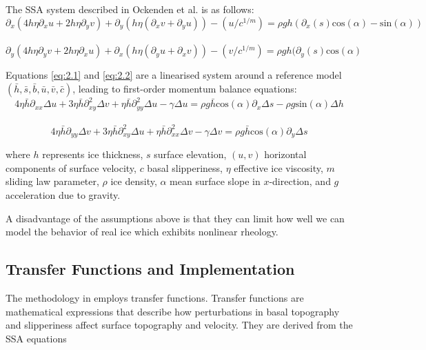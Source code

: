 The SSA system described in Ockenden et al.\cite{Ockenden_2022} is as follows:
\begin{equation}\partial_{x} (4 h \eta \partial_{x} u + 2 h \eta \partial_y v) + \partial_{y}(h \eta( \partial_{x} v + \partial_{y} u)) - (u/c^{1/m}) = \rho g h ( \partial_{x} (s) \mathrm{cos}(\alpha) - \mathrm{sin}(\alpha))
\end{equation}\label{eq:2.1}\\
\begin{equation}\partial_{y} (4 h \eta \partial_{y} v + 2 h \eta \partial_x u) + \partial_{x}(h \eta( \partial_{y} u + \partial_{x} v)) - (v/c^{1/m}) = \rho g h ( \partial_{y} (s) \mathrm{cos}(\alpha)
\end{equation}\label{eq:2.2}

Equations \ref{eq:2.1} and \ref{eq:2.2} are a linearised system around a reference model $(\bar{h}, \bar{s}, \bar{b}, \bar{u}, \bar{v}, \bar{c})$, leading to first-order momentum balance equations:
\begin{equation}
4 \eta \bar{h} \partial_{xx} \Delta u + 3 \eta \bar{h} \partial_{xy}^{2} \Delta v + \eta \bar{h} \partial_{yy}^{2}\Delta u -\gamma \Delta u  = \rho g \bar{h}\mathrm{cos}(\alpha) \partial_x \Delta s - \rho g \mathrm{sin}(\alpha)\Delta h
\end{equation}\\
\begin{equation}
4 \eta \bar{h} \partial_{yy} \Delta v + 3 \eta \bar{h} \partial_{xy}^{2} \Delta u + \eta \bar{h} \partial_{xx}^{2}\Delta v -\gamma \Delta v  = \rho g \bar{h}\mathrm{cos}(\alpha) \partial_y \Delta s
\end{equation}

where $h$ represents ice thickness, $s$ surface elevation, $(u, v)$ horizontal components of surface velocity, $c$ basal slipperiness, $\eta$ effective ice viscosity, $m$ sliding law parameter, $\rho$ ice density, $\alpha$ mean surface slope in $x$-direction, and $g$ acceleration due to gravity.

A disadvantage of the  assumptions above is that they can limit how well we can model the behavior of real ice which exhibits nonlinear rheology.

\subsection*{Transfer Functions and Implementation}

The methodology in \cite{Ockenden_2022} employs transfer functions. Transfer functions are mathematical expressions that describe how perturbations in basal topography and slipperiness affect surface topography and velocity. They are derived from the SSA equations

